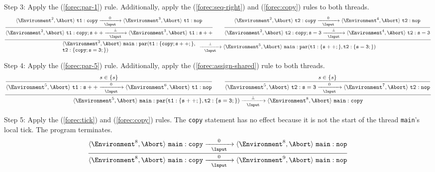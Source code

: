 \noindent
Step 3: Apply the (\ref{forec:par-1}) rule. Additionally, apply the 
(\ref{forec:seq-right}) and (\ref{forec:copy}) rules to both threads.
\begin{equation*}
	\frac{
		\dfrac{
				\langle \Environment^2, \Abort \rangle ~ \mathtt{t1: copy}
					\xrightarrow[~~\Input~~]{0} 
				\langle \Environment^3, \Abort \rangle ~ \mathtt{t1: nop}
			}{
				\langle \Environment^2, \Abort \rangle ~ \mathtt{t1: copy; s++}
					\xrightarrow[~~\Input~~]{\bot} 
				\langle \Environment^3, \Abort \rangle ~ \mathtt{t1: s++}
			}
			\qquad
		\dfrac{
				\langle \Environment^2, \Abort \rangle ~ \mathtt{t2: copy}
					\xrightarrow[~~\Input~~]{0} 
				\langle \Environment^4, \Abort \rangle ~ \mathtt{t2: nop}
			}{
				\langle \Environment^2, \Abort \rangle ~ \mathtt{t2: copy; s=3}
					\xrightarrow[~~\Input~~]{\bot} 
				\langle \Environment^4, \Abort \rangle ~ \mathtt{t2: s=3}
			}
		}{
			\begin{array}{l}
				\langle \Environment^2, \Abort \rangle ~ \mathtt{main: par(t1:\{copy; s++;\},}	\\
				\mathtt{t2:\{copy; s=3;\})}														\\
			\end{array}
				\xrightarrow[~~\Input~~]{\bot} 
			\langle \Environment^5, \Abort \rangle ~ \mathtt{main: par(t1:\{s++;\},t2:\{s=3;\})}
		}
\end{equation*}

\noindent
Step 4: Apply the (\ref{forec:par-5}) rule. Additionally, apply the 
(\ref{forec:assign-shared}) rule to both threads.
\begin{equation*}
	\frac{
		\dfrac{
				s \in \lbrace s \rbrace
			}{
				\langle \Environment^5, \Abort \rangle ~ \mathtt{t1: s++}
					\xrightarrow[~~\Input~~]{0} 
				\langle \Environment^6, \Abort \rangle ~ \mathtt{t1: nop}
			}
			\qquad
		\dfrac{
				s \in \lbrace s \rbrace
			}{
				\langle \Environment^5, \Abort \rangle ~ \mathtt{t2: s=3}
					\xrightarrow[~~\Input~~]{0} 
				\langle \Environment^7, \Abort \rangle ~ \mathtt{t2: nop}
			}
		}{
			\langle \Environment^5, \Abort \rangle ~ \mathtt{main: par(t1:\{s++;\},t2:\{s=3;\})}
				\xrightarrow[~~\Input~~]{\bot} 
			\langle \Environment^8, \Abort \rangle ~ \mathtt{main: copy}
		}
\end{equation*}

\noindent
Step 5: Apply the (\ref{forec:tick}) and (\ref{forec:copy}) rules.
The \verb$copy$ statement has no effect because it is not the start of
the thread \verb$main$'s local tick. The program terminates.
\begin{equation*}
	\frac{
			\langle \Environment^8, \Abort \rangle ~ \mathtt{main: copy}
				\xrightarrow[~~\Input~~]{0} 
			\langle \Environment^8, \Abort \rangle ~ \mathtt{main: nop}
		}{
			\langle \Environment^8, \Abort \rangle ~ \mathtt{main: copy}
				\xrightarrow[~~\Input~~]{0} 
			\langle \Environment^9, \Abort \rangle ~ \mathtt{main: nop}
		}
\end{equation*}

